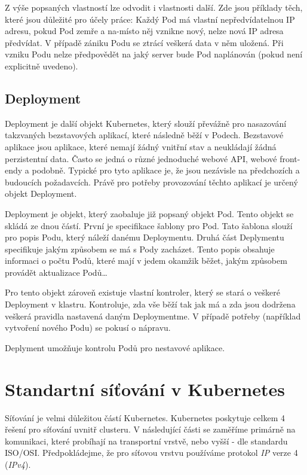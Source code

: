 Z výše popsaných vlastností lze odvodit i vlastnosti další. Zde jsou příklady těch, které jsou důležité pro účely práce: Každý Pod má vlastní nepředvídatelnou IP adresu, pokud Pod zemře a na-místo něj vznikne nový, nelze nová IP adresa předvídat. V případě zániku Podu se ztrácí veškerá data v něm uložená. Při vzniku Podu nelze předpovědět na jaký server bude Pod naplánován (pokud není explicitně uvedeno). 

\subsection{Deployment}
Deployment je další objekt Kubernetes, který slouží převážně pro nasazování takzvaných bezstavových aplikací, které následně běží v Podech. Bezstavové aplikace jsou aplikace, které nemají žádný vnitřní stav a neukládají žádná perzistentní data. Často se jedná o různé jednoduché webové API, webové front-endy a podobně. Typické pro tyto aplikace je, že jsou nezávisle na předchozích a budoucích požadavcích. Právě pro potřeby provozování těchto aplikací je určený objekt Deployment.

Deployment je objekt, který zaobaluje již popsaný objekt Pod. Tento objekt se skládá ze dnou částí. První je specifikace šablony pro Pod. Tato šablona slouží pro popis Podu, který náleží danému Deploymentu. Druhá část Deplymentu specifikuje jakým způsobem se má s Pody zacházet. Tento popis obsahuje informaci o počtu Podů, které mají v jedem okamžik běžet, jakým způsobem provádět aktualizace Podů\ldots

Pro tento objekt zároveň existuje vlastní kontroler, který se stará o veškeré Deployment v klastru. Kontroluje, zda vše běží tak jak má a zda jsou dodržena veškerá pravidla nastavená daným Deploymentme. V případě potřeby (například vytvoření nového Podu) se pokusí o nápravu.\cite{poulton_2022_the}

Deplyment umožňuje kontrolu Podů pro nestavové aplikace.
\section{Standartní síťování v Kubernetes}
Síťování je velmi důležitou částí Kubernetes. Kubernetes poskytuje celkem 4 řešení pro síťování uvnitř clusteru. V následující části se zaměříme primárně na komunikaci, které probíhají na transportní vrstvě, nebo vyšší - dle standardu ISO/OSI. Předpokládejme, že pro síťovou vrstvu používáme protokol \textit{IP} verze 4 (\textit{IPv4}).

